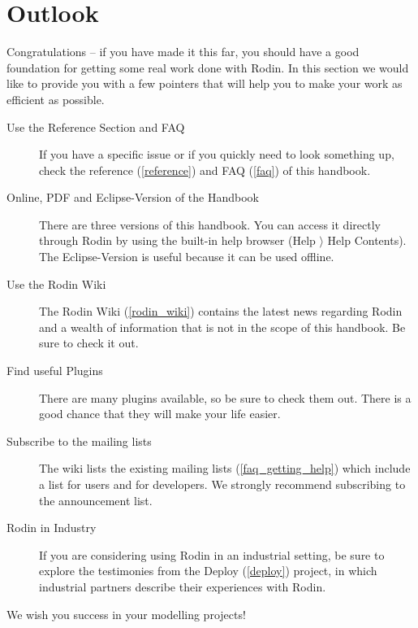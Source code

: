 \section{Outlook}
\label{tut_outlook}

Congratulations -- if you have made it this far, you should have a good foundation for getting some real work done with Rodin.  In this section we would like to provide you with a few pointers that will help you to make your work as efficient as possible.

\begin{description}
	\item[Use the Reference Section and FAQ] If you have a specific issue or if you quickly need to look something up, check the reference (\ref{reference}) and FAQ (\ref{faq}) of this handbook.
	\item[Online, PDF and Eclipse-Version of the Handbook] There are three versions of this handbook.  You can access it directly through Rodin by using the built-in help browser (\textsf{Help $\rangle$ Help Contents}).  The Eclipse-Version is useful because it can be used offline.
	\item[Use the Rodin Wiki] The Rodin Wiki (\ref{rodin_wiki}) contains the latest news regarding Rodin and a wealth of information that is not in the scope of this handbook.  Be sure to check it out.
	\item[Find useful Plugins] There are many plugins available, so be sure to check them out.  There is a good chance that they will make your life easier.
	\item[Subscribe to the mailing lists] The wiki lists the existing mailing lists (\ref{faq_getting_help}) which include a list for users and for developers.  We strongly recommend subscribing to the announcement list.
	\item[Rodin in Industry] If you are considering using Rodin in an industrial setting, be sure to explore the testimonies from the Deploy (\ref{deploy}) project, in which industrial partners describe their experiences with Rodin.
\end{description}

We wish you success in your modelling projects!

